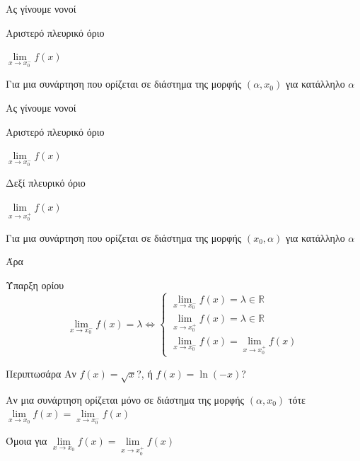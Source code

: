 \documentclass[greek]{beamer}
\begin{document}
\begin{frame}{Ας γίνουμε νονοί}
      \begin{block}{Αριστερό πλευρικό όριο}
            \begin{center}
                  $\lim\limits_{x \to x_0^-}{ f(x) }$ \pause
            \end{center}

            Για μια συνάρτηση που ορίζεται σε διάστημα της μορφής $(α,x_0)$ για κατάλληλο $α$
      \end{block}
\end{frame}

\begin{frame}{Ας γίνουμε νονοί}
      \begin{block}{Αριστερό πλευρικό όριο}
            \begin{center}
                  $\lim\limits_{x \to x_0^-}{ f(x) }$ \pause
            \end{center}
      \end{block}
      \begin{block}{Δεξί πλευρικό όριο}
            \begin{center}
                  $\lim\limits_{x \to x_0^+}{ f(x) }$ \pause
            \end{center}

            Για μια συνάρτηση που ορίζεται σε διάστημα της μορφής $(x_0,α)$ για κατάλληλο $α$
      \end{block}
\end{frame}

\begin{frame}{Άρα}
      \begin{block}{Ύπαρξη ορίου}
            \begin{equation*}
                  \lim\limits_{x \to x_0^-}{ f(x) }=λ\iff
                  \begin{cases}
                        \lim\limits_{x \to x_0^-}{ f(x) }=λ\in\mathbb{R} \\
                        \lim\limits_{x \to x_0^+}{ f(x) }=λ\in\mathbb{R} \\
                        \lim\limits_{x \to x_0^-}{ f(x) }=\lim\limits_{x \to x_0^+}{ f(x) }
                  \end{cases}
            \end{equation*}
      \end{block}
\end{frame}

\begin{frame}{Περιπτωσάρα}
      Αν $f(x)=\sqrt{x}$?, ή $f(x)=\ln (-x)$? \pause
      \begin{block}{ }
            Αν μια συνάρτηση ορίζεται μόνο σε διάστημα της μορφής $(α,x_0)$ τότε $\lim\limits_{x \to x_0}{ f(x) }=\lim\limits_{x \to x_0^-}{ f(x) }$
      \end{block} \pause
      Όμοια για $\lim\limits_{x \to x_0}{ f(x) }=\lim\limits_{x \to x_0^+}{ f(x) }$
\end{frame}
\end{document}
